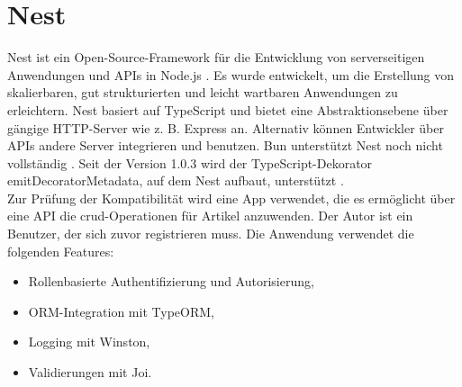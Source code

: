 \section{Nest} \label{sec:compabitility-nest}
Nest ist ein Open-Source-Framework für die Entwicklung von serverseitigen Anwendungen und APIs in Node.js \cite{Mysliwiec.2023}. Es wurde entwickelt, um die Erstellung von skalierbaren, gut strukturierten und leicht wartbaren Anwendungen zu erleichtern. Nest basiert auf TypeScript und bietet eine Abstraktionsebene über gängige HTTP-Server wie z. B. Express an. Alternativ können Entwickler über APIs andere Server integrieren und benutzen. Bun unterstützt Nest noch nicht vollständig \cite{Sumner.2022b}. Seit der Version 1.0.3 wird der TypeScript-Dekorator \glq emitDecoratorMetadata\grq{}, auf dem Nest aufbaut, unterstützt \cite{McDonnel.2023}.\\

\noindent
Zur Prüfung der Kompatibilität wird eine App verwendet, die es ermöglicht über eine API die \ac{crud}-Operationen für Artikel anzuwenden. Der Autor ist ein Benutzer, der sich zuvor registrieren muss. Die Anwendung verwendet die folgenden Features:

\begin{itemize}
	\item Rollenbasierte Authentifizierung und Autorisierung,
	\item ORM-Integration mit TypeORM,
	\item Logging mit Winston,
	\item Validierungen mit Joi.
\end{itemize}

